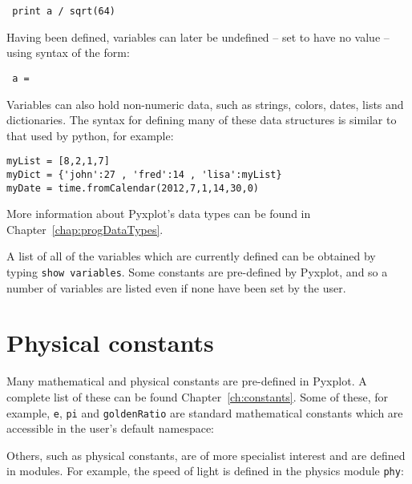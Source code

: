 \begin{verbatim} print a / sqrt(64) \end{verbatim}

\noindent Having been defined, variables can later be undefined -- set to have
no value -- using syntax of the form:

\begin{verbatim} a = \end{verbatim}

Variables can also hold non-numeric data, such as strings, colors, dates, lists
and dictionaries. The syntax for defining many of these data structures is
similar to that used by python, for example:

\begin{verbatim}
myList = [8,2,1,7]
myDict = {'john':27 , 'fred':14 , 'lisa':myList}
myDate = time.fromCalendar(2012,7,1,14,30,0)
\end{verbatim}

\noindent More information about Pyxplot's data types can be found in Chapter~\ref{chap:progDataTypes}.

A list of all of the variables which are currently defined can be obtained by
typing {\tt show variables}. Some constants are
pre-defined by Pyxplot, and so a number of variables are listed even if none
have been set by the user.

\section{Physical constants} \label{sec:constants} 

Many mathematical and physical constants are pre-defined in Pyxplot.  A
complete list of these can be found Chapter~\ref{ch:constants}.  Some of these,
for example, {\tt e}, {\tt pi} and {\tt goldenRatio} are standard mathematical
constants which are accessible in the user's default namespace:

\vspace{3mm}

\vspace{3mm}

\noindent Others, such as physical constants, are of more specialist interest
and are defined in modules. For example, the speed of light is defined in the
physics module {\tt phy}:

\vspace{3mm}

\vspace{3mm}


